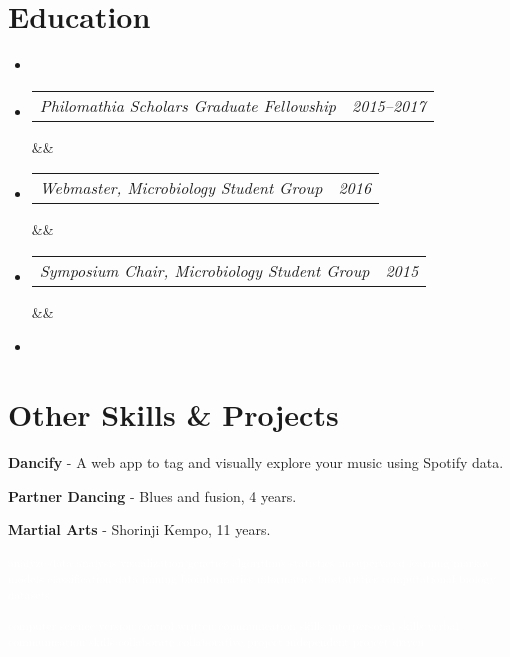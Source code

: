 \documentclass[11pt,letterpaper,sans]{moderncv}        %
\makeatletter
\newcommand*{\cvsimple}[4][.25em]{
  \begin{tabular*}{\maincolumnwidth}{l@{\extracolsep{\fill}}r}%
    {\itshape #3} & {\itshape #2}\\%
  \end{tabular*}%
  \ifx&#4&%
  \else{\\%
    \begin{minipage}{\maincolumnwidth}%
      \small#4%
    \end{minipage}}\fi%
  \par\addvspace{#1}}
\makeatother
\begin{document}
\pagebreak

\section{Education}
\begin{itemize}

\vspace{5pt}
\item{}
\item[]{\cvsimple{2015--2017}{Philomathia Scholars Graduate Fellowship}{}}
\item[]{\cvsimple{2016}{Webmaster, Microbiology Student Group}{}}
\item[]{\cvsimple{2015}{Symposium Chair, Microbiology Student Group}{}}
  
\vspace{5pt}
\item{}

\end{itemize}

\nocite{*} %


\section{Other Skills \& Projects}

\begin{multicols}{3}

  \textbf{Dancify} - A web app to tag and visually explore your music using Spotify data.

  \textbf{Partner Dancing} - Blues and fusion, 4 years.
  \newline

  \textbf{Martial Arts} - Shorinji Kempo, 11 years.
  \newline

\end{multicols}

\textcolor{white}{\tiny \textsuperscript{analyze data analysis visualization genetics algorithms statistics unsupervised learning markov models classification data mining bioinformatics informatics biostatistics computational biology datasets} }

\textcolor{white}{\tiny \textsuperscript{computer science version control written communication skills interpersonal skills verbal communication skills collaborate collaborative project independent project driven} }
\end{document}
